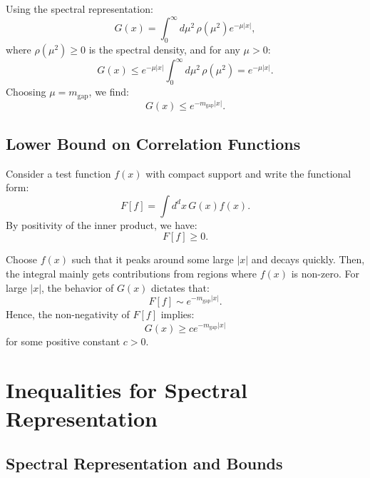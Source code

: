Using the spectral representation:
\begin{equation}
G(x) = \int_0^\infty d\mu^2 \, \rho(\mu^2) e^{-\mu |x|},
\end{equation}
where \(\rho(\mu^2) \geq 0\) is the spectral density, and for any \(\mu > 0\):
\begin{equation}
G(x) \leq e^{-\mu |x|} \int_0^\infty d\mu^2 \, \rho(\mu^2) = e^{-\mu |x|}.
\end{equation}
Choosing \(\mu = m_{\text{gap}}\), we find:
\begin{equation}
G(x) \leq e^{-m_{\text{gap}} |x|}.
\end{equation}

\subsection{Lower Bound on Correlation Functions}

Consider a test function \(f(x)\) with compact support and write the functional form:
\begin{equation}
F[f] = \int d^dx \, G(x) f(x).
\end{equation}
By positivity of the inner product, we have:
\begin{equation}
F[f] \geq 0.
\end{equation}

Choose \(f(x)\) such that it peaks around some large \(|x|\) and decays quickly. Then, the integral mainly gets contributions from regions where \(f(x)\) is non-zero. For large \(|x|\), the behavior of \(G(x)\) dictates that:
\begin{equation}
F[f] \sim e^{-m_{\text{gap}} |x|}.
\end{equation}
Hence, the non-negativity of \(F[f]\) implies:
\begin{equation}
G(x) \geq c e^{-m_{\text{gap}} |x|}
\end{equation}
for some positive constant \(c > 0\).



\section{Inequalities for Spectral Representation}

\subsection{Spectral Representation and Bounds}

